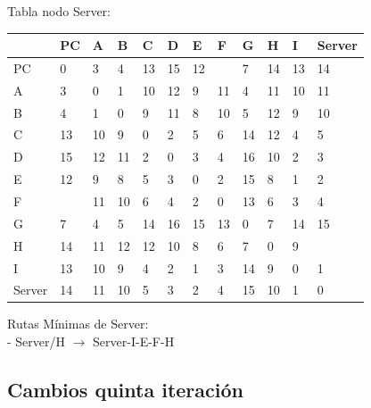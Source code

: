 \documentclass[a4paper]{article}
\begin{document}
\begin{table}[h]
Tabla nodo Server:\\
\begin{tabular}{|l|l|l|l|l|l|l|l|l|l|l|l|}
\hline
       & PC & A  & B  & C  & D  & E  & F  & G  & H  & I  & Server \\ \hline
PC     & 0  & 3  & 4  & 13 & 15 & 12 &    & 7  & 14 & 13 & 14     \\ \hline
A      & 3  & 0  & 1  & 10 & 12 & 9  & 11 & 4  & 11 & 10 & 11     \\ \hline
B      & 4  & 1  & 0  & 9  & 11 & 8  & 10 & 5  & 12 & 9  & 10     \\ \hline
C      & 13 & 10 & 9  & 0  & 2  & 5  & 6  & 14 & 12 & 4  & 5      \\ \hline
D      & 15 & 12 & 11 & 2  & 0  & 3  & 4  & 16 & 10 & 2  & 3      \\ \hline
E      & 12 & 9  & 8  & 5  & 3  & 0  & 2  & 15 & 8  & 1  & 2      \\ \hline
F      &    & 11 & 10 & 6  & 4  & 2  & 0  & 13 & 6  & 3  & 4      \\ \hline
G      & 7  & 4  & 5  & 14 & 16 & 15 & 13 & 0  & 7  & 14 & 15     \\ \hline
H      & 14 & 11 & 12 & 12 & 10 & 8  & 6  & 7  & 0  & 9  &        \\ \hline
I      & 13 & 10 & 9  & 4  & 2  & 1  & 3  & 14 & 9  & 0  & 1      \\ \hline
Server & 14 & 11 & 10 & 5  & 3  & 2  & 4  & 15 & 10 & 1  & 0      \\ \hline
\end{tabular}

Rutas Mínimas de Server:\\

-	Server/H  $\rightarrow$  Server-I-E-F-H\\

\end{table}
\clearpage

\subsection{Cambios quinta iteración}
\end{document}
